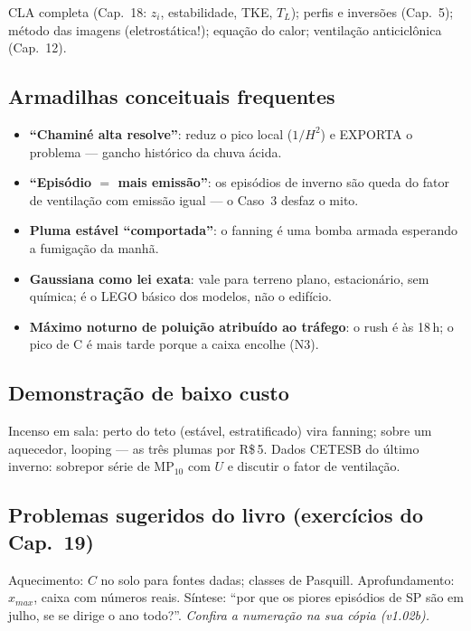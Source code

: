 CLA completa (Cap.~18: $z_i$, estabilidade, TKE, $T_L$); perfis e
inversões (Cap.~5); método das imagens (eletrostática!); equação do
calor; ventilação anticiclônica (Cap.~12).

\subsection*{Armadilhas conceituais frequentes}

\begin{itemize}
  \item \textbf{``Chaminé alta resolve''}: reduz o pico local
        ($1/H^2$) e EXPORTA o problema — gancho histórico da chuva
        ácida.
  \item \textbf{``Episódio $=$ mais emissão''}: os episódios de
        inverno são queda do fator de ventilação com emissão igual —
        o Caso~3 desfaz o mito.
  \item \textbf{Pluma estável ``comportada''}: o fanning é uma bomba
        armada esperando a fumigação da manhã.
  \item \textbf{Gaussiana como lei exata}: vale para terreno plano,
        estacionário, sem química; é o LEGO básico dos modelos, não
        o edifício.
  \item \textbf{Máximo noturno de poluição atribuído ao tráfego}: o
        rush é às 18\,h; o pico de C é mais tarde porque a caixa
        encolhe (N3).
\end{itemize}

\subsection*{Demonstração de baixo custo}

Incenso em sala: perto do teto (estável, estratificado) vira fanning;
sobre um aquecedor, looping — as três plumas por R\$\,5. Dados
CETESB do último inverno: sobrepor série de MP$_{10}$ com $U$ e
discutir o fator de ventilação.

\subsection*{Problemas sugeridos do livro (exercícios do Cap.~19)}

Aquecimento: $C$ no solo para fontes dadas; classes de Pasquill.
Aprofundamento: $x_{max}$, caixa com números reais. Síntese: ``por
que os piores episódios de SP são em julho, se se dirige o ano
todo?''. \emph{Confira a numeração na sua cópia (v1.02b).}

